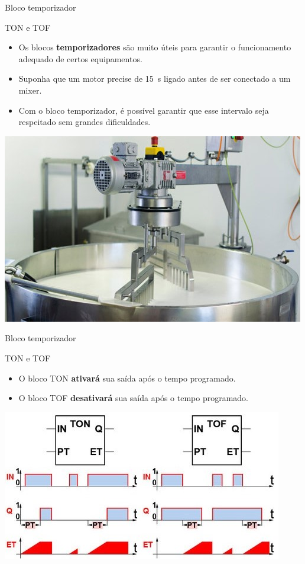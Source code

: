 \begin{frame}{Bloco temporizador}
	\begin{block}{TON e TOF}
		\begin{itemize}
			\item Os blocos \textbf{temporizadores} são muito úteis para garantir o funcionamento adequado de certos equipamentos.
			\item Suponha que um motor precise de \SI{15}{\second} ligado antes de ser conectado a um mixer.
			\item Com o bloco temporizador, é possível garantir que esse intervalo seja respeitado sem grandes dificuldades.
		\end{itemize}
	\end{block}

	\centering
	
	\includegraphics[height=0.45\textheight]{Figuras/Ch10/fig8}
	
\end{frame}


\begin{frame}{Bloco temporizador}
	\begin{block}{TON e TOF}
		\begin{itemize}
			\item O bloco TON \textbf{ativará} sua saída após o tempo programado.
			\item O bloco TOF \textbf{desativará} sua saída após o tempo programado.
		\end{itemize}
	\end{block}

	\medskip
	
	\centering
	
	\includegraphics[height=0.6\textheight]{Figuras/Ch10/fig9}
	
\end{frame}


